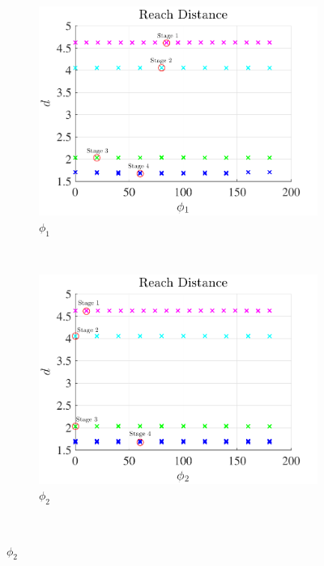 \documentclass[]{aiaa-tc}%
\begin{document}
\begin{figure}[htbp] 
    \centering 
    \begin{subfigure}[htbp]{0.3\textwidth} 
        \includegraphics[width=\textwidth]{figures/phi1.pdf} 
        \caption{ \( \phi_1 \)} \label{fig:phi1} 
    \end{subfigure}~ %
    \begin{subfigure}[htbp]{0.3\textwidth} 
        \includegraphics[width=\textwidth]{figures/phi2.pdf} 
        \caption{\( \phi_2 \)} \label{fig:phi2} 
    \end{subfigure}~ %

\end{figure}
\end{document}
